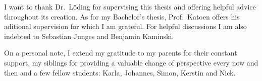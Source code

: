 \begin{acknowledgements}
  I want to thank Dr.~Löding for supervising this thesis and offering helpful
  advice throughout its creation. As for my Bachelor's thesis, Prof.~Katoen
  offers his aditional supervision for which I am grateful. For helpful
  discussions I am also indebted to Sebastian Junges and Benjamin Kaminski.

  On a personal note, I extend my gratitude to my parents for their constant
  support, my siblings for providing a valuable change of perspective every now
  and then and a few fellow students: Karla, Johannes, Simon, Kerstin and Nick.
\end{acknowledgements}
